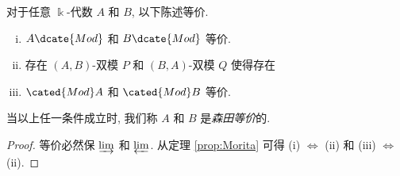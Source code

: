 \begin{definition-proposition}\label{def:Morita-equiv}
	对于任意 $\Bbbk$-代数 $A$ 和 $B$, 以下陈述等价.
	\begin{enumerate}[(i)]
		\item $A\dcate{Mod}$ 和 $B\dcate{Mod}$ 等价.
		\item 存在 $(A, B)$-双模 $P$ 和 $(B, A)$-双模 $Q$ 使得存在
		\item $\cated{Mod}A$ 和 $\cated{Mod}B$ 等价.
	\end{enumerate}
	当以上任一条件成立时, 我们称 $A$ 和 $B$ 是\emph{森田等价}的.
\end{definition-proposition}
\begin{proof}
	等价必然保 $\varinjlim$ 和 $\varprojlim$. 从定理 \ref{prop:Morita} 可得 (i) $\iff$ (ii) 和 (iii) $\iff$ (ii).
\end{proof}
